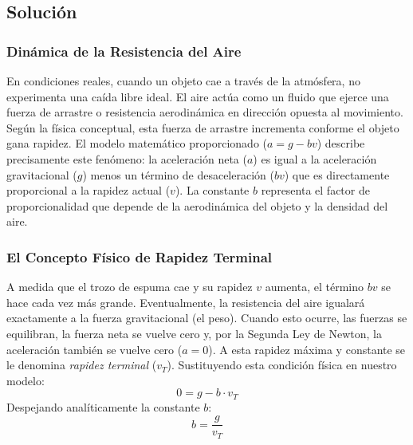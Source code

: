 \documentclass[12pt]{article}
\begin{document}
\subsection*{Solución}

\subsubsection*{Dinámica de la Resistencia del Aire}
En condiciones reales, cuando un objeto cae a través de la atmósfera, no experimenta una caída libre ideal. El aire actúa como un fluido que ejerce una fuerza de arrastre o resistencia aerodinámica en dirección opuesta al movimiento. Según la física conceptual, esta fuerza de arrastre incrementa conforme el objeto gana rapidez. 
El modelo matemático proporcionado ($a = g - bv$) describe precisamente este fenómeno: la aceleración neta ($a$) es igual a la aceleración gravitacional ($g$) menos un término de desaceleración ($bv$) que es directamente proporcional a la rapidez actual ($v$). La constante $b$ representa el factor de proporcionalidad que depende de la aerodinámica del objeto y la densidad del aire.

\subsubsection*{El Concepto Físico de Rapidez Terminal}
A medida que el trozo de espuma cae y su rapidez $v$ aumenta, el término $bv$ se hace cada vez más grande. Eventualmente, la resistencia del aire igualará exactamente a la fuerza gravitacional (el peso). Cuando esto ocurre, las fuerzas se equilibran, la fuerza neta se vuelve cero y, por la Segunda Ley de Newton, la aceleración también se vuelve cero ($a = 0$).
A esta rapidez máxima y constante se le denomina \textit{rapidez terminal} ($v_T$). Sustituyendo esta condición física en nuestro modelo:
\begin{equation}
    0 = g - b \cdot v_T
\end{equation}
Despejando analíticamente la constante $b$:
\begin{equation}
    b = \frac{g}{v_T}
\end{equation}
\end{document}
